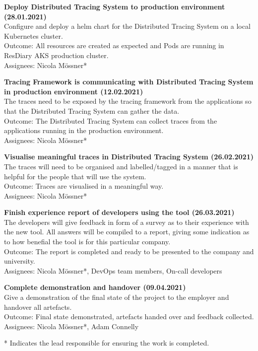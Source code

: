 \documentclass[11pt]{article}
\begin{document}
\textbf{Deploy Distributed Tracing System to production environment (28.01.2021)}\\
Configure and deploy a helm chart for the Distributed Tracing System on a local Kubernetes cluster.\\
Outcome: All resources are created as expected and Pods are running in ResDiary AKS production cluster.\\
Assignees: Nicola M\"{o}ssner*

\textbf{Tracing Framework is communicating with Distributed Tracing System in production environment (12.02.2021)}\\
The traces need to be exposed by the tracing framework from the applications so that the Distributed Tracing System can gather the data.\\
Outcome: The Distributed Tracing System can collect traces from the applications running in the production environment.\\
Assignees: Nicola M\"{o}ssner*

\textbf{Visualise meaningful traces in Distributed Tracing System (26.02.2021)}\\
The traces will need to be organised and labelled/tagged in a manner that is helpful for the people that will use the system.\\
Outcome: Traces are visualised in a meaningful way.\\
Assignees: Nicola M\"{o}ssner*

\textbf{Finish experience report of developers using the tool (26.03.2021)}\\
The developers will give feedback in form of a survey as to their experience with the new tool. All answers will be compiled to a report, giving some indication as to how benefial the tool is for this particular company.\\
Outcome: The report is completed and ready to be presented to the company and university.\\
Assignees: Nicola M\"{o}ssner*, DevOps team members, On-call developers

\textbf{Complete demonstration and handover (09.04.2021)}\\
Give a demonstration of the final state of the project to the employer and handover all artefacts.\\
Outcome: Final state demonstrated, artefacts handed over and feedback collected.\\
Assignees: Nicola M\"{o}ssner*, Adam Connelly

* Indicates the lead responsible for ensuring the work is completed.




\end{document}

